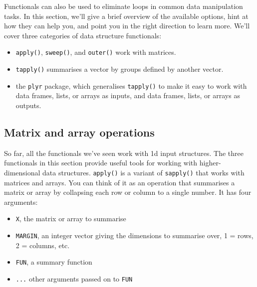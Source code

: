 
Functionals can also be used to eliminate loops in common data
manipulation tasks. In this section, we'll give a brief overview of the
available options, hint at how they can help you, and point you in the
right direction to learn more. We'll cover three categories of data
structure functionals:

\begin{itemize}
\item
  \texttt{apply()}, \texttt{sweep()}, and \texttt{outer()} work with
  matrices.
\item
  \texttt{tapply()} summarises a vector by groups defined by another
  vector.
\item
  the \texttt{plyr} package, which generalises \texttt{tapply()} to make
  it easy to work with data frames, lists, or arrays as inputs, and data
  frames, lists, or arrays as outputs.
\end{itemize}

\subsection{Matrix and array operations}

So far, all the functionals we've seen work with 1d input structures.
The three functionals in this section provide useful tools for working
with higher-dimensional data structures. \texttt{apply()} is a variant
of \texttt{sapply()} that works with matrices and arrays. You can think
of it as an operation that summarises a matrix or array by collapsing
each row or column to a single number. It has four arguments:

\begin{itemize}
\itemsep1pt\parskip0pt
\item
  \texttt{X}, the matrix or array to summarise
\item
  \texttt{MARGIN}, an integer vector giving the dimensions to summarise
  over, 1 = rows, 2 = columns, etc.
\item
  \texttt{FUN}, a summary function
\item
  \texttt{...} other arguments passed on to \texttt{FUN}
\end{itemize}

